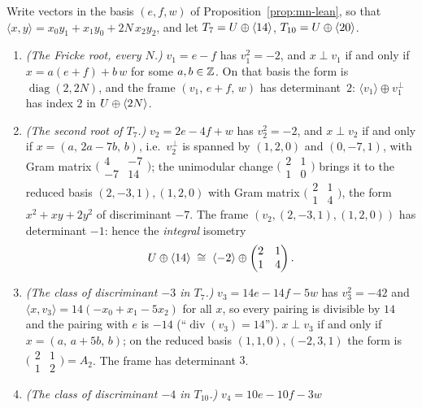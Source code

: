 \begin{proposition}[status (K)]\label{prop:rankjump}
Write vectors in the basis $(e,f,w)$ of Proposition~\ref{prop:mn-lean}, so
that $\langle x,y\rangle = x_0y_1+x_1y_0+2N\,x_2y_2$, and let
$T_7=U\oplus\langle 14\rangle$, $T_{10}=U\oplus\langle 20\rangle$.
\begin{enumerate}
\item \emph{(The Fricke root, every $N$.)} $v_1=e-f$ has $v_1^2=-2$, and
  $x\perp v_1$ if and only if $x=a(e+f)+b\,w$ for some $a,b\in\mathbb{Z}$. On that
  basis the form is $\operatorname{diag}(2,2N)$, and the frame
  $(v_1,\,e+f,\,w)$ has determinant~$2$: $\langle v_1\rangle\oplus v_1^{\perp}$
  has index $2$ in $U\oplus\langle 2N\rangle$.
\item \emph{(The second root of $T_7$.)} $v_2=2e-4f+w$ has $v_2^2=-2$, and
  $x\perp v_2$ if and only if $x=(a,\,2a-7b,\,b)$, i.e.\ $v_2^{\perp}$ is
  spanned by $(1,2,0)$ and $(0,-7,1)$, with Gram matrix
  $\bigl(\begin{smallmatrix}4&-7\\-7&14\end{smallmatrix}\bigr)$; the
  unimodular change $\bigl(\begin{smallmatrix}2&1\\1&0\end{smallmatrix}\bigr)$
  brings it to the reduced basis $(2,-3,1),(1,2,0)$ with Gram matrix
  $\bigl(\begin{smallmatrix}2&1\\1&4\end{smallmatrix}\bigr)$, the form
  $x^2+xy+2y^2$ of discriminant $-7$. The frame $(v_2,(2,-3,1),(1,2,0))$ has
  determinant $-1$: hence the \emph{integral} isometry
  \[
    U\oplus\langle 14\rangle\;\cong\;\langle -2\rangle\oplus
    \begin{pmatrix}2&1\\1&4\end{pmatrix}.
  \]
\item \emph{(The class of discriminant $-3$ in $T_7$.)} $v_3=14e-14f-5w$ has
  $v_3^2=-42$ and $\langle x,v_3\rangle = 14(-x_0+x_1-5x_2)$ for all $x$, so
  every pairing is divisible by $14$ and the pairing with $e$ is $-14$
  (``$\operatorname{div}(v_3)=14$''). $x\perp v_3$ if and only if
  $x=(a,\,a+5b,\,b)$; on the reduced basis $(1,1,0),(-2,3,1)$ the form is
  $\bigl(\begin{smallmatrix}2&1\\1&2\end{smallmatrix}\bigr)=A_2$. The frame
  has determinant $3$.
\item \emph{(The class of discriminant $-4$ in $T_{10}$.)} $v_4=10e-10f-3w$

\end{enumerate}
\end{proposition}
